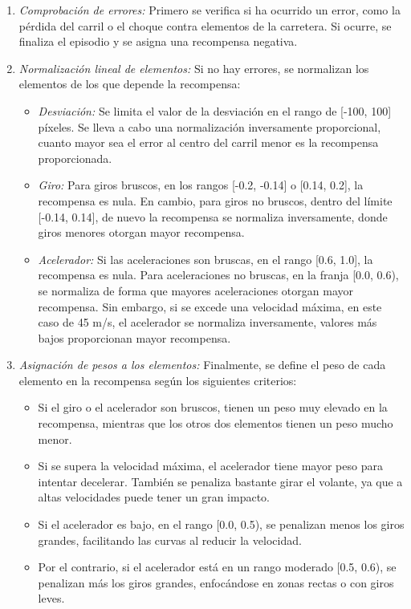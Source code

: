 \begin{enumerate}
\item \textit{Comprobación de errores:} Primero se verifica si ha ocurrido un error, como la pérdida del carril o el choque contra elementos de la carretera. Si ocurre, se finaliza el episodio y se asigna una recompensa negativa.
\item \textit{Normalización lineal de elementos:} Si no hay errores, se normalizan los elementos de los que depende la recompensa:
\begin{itemize}
\item \textit{Desviación:} Se limita el valor de la desviación en el rango de [-100, 100] píxeles. Se lleva a cabo una normalización inversamente proporcional, cuanto mayor sea el error al centro del carril menor es la recompensa proporcionada.
\item \textit{Giro:} Para giros bruscos, en los rangos [-0.2, -0.14] o [0.14, 0.2], la recompensa es nula. En cambio, para giros no bruscos, dentro del límite [-0.14, 0.14], de nuevo la recompensa se normaliza inversamente, donde giros menores otorgan mayor recompensa.
\item \textit{Acelerador:} Si las aceleraciones son bruscas, en el rango [0.6, 1.0], la recompensa es nula. Para aceleraciones no bruscas, en la franja [0.0, 0.6), se normaliza de forma que mayores aceleraciones otorgan mayor recompensa. Sin embargo, si se excede una velocidad máxima, en este caso de 45 m/s, el acelerador se normaliza inversamente, valores más bajos proporcionan mayor recompensa.
\end{itemize}

\item \textit{Asignación de pesos a los elementos:} Finalmente, se define el peso de cada elemento en la recompensa según los siguientes criterios:
\begin{itemize}
\item Si el giro o el acelerador son bruscos, tienen un peso muy elevado en la recompensa, mientras que los otros dos elementos tienen un peso mucho menor.
\item Si se supera la velocidad máxima, el acelerador tiene mayor peso para intentar decelerar. También se penaliza bastante girar el volante, ya que a altas velocidades puede tener un gran impacto.
\item Si el acelerador es bajo, en el rango [0.0, 0.5), se penalizan menos los giros grandes, facilitando las curvas al reducir la velocidad.
\item Por el contrario, si el acelerador está en un rango moderado [0.5, 0.6), se penalizan más los giros grandes, enfocándose en zonas rectas o con giros leves.
\end{itemize}
\end{enumerate}

